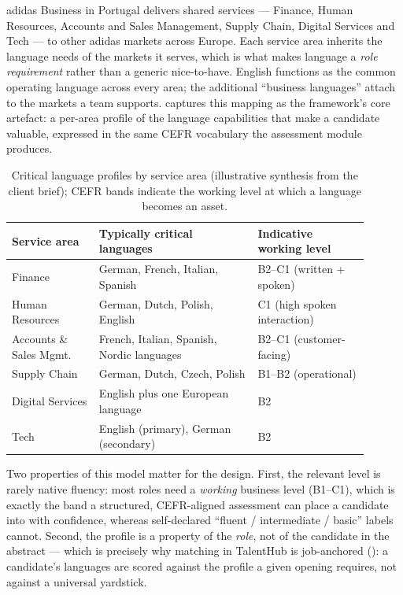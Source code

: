 adidas Business in Portugal delivers shared services --- Finance, Human
Resources, Accounts and Sales Management, Supply Chain, Digital Services and
Tech --- to other adidas markets across Europe. Each service area inherits the
language needs of the markets it serves, which is what makes language a
\emph{role requirement} rather than a generic nice-to-have. English functions
as the common operating language across every area; the additional ``business
languages'' attach to the markets a team supports.
 captures this mapping as the framework's
core artefact: a per-area profile of the language capabilities that make a
candidate valuable, expressed in the same CEFR vocabulary the assessment
module produces.

\begin{table}[ht]
\centering
\caption[Critical language profiles by service area]{Critical language
profiles by service area (illustrative synthesis from the client brief); CEFR
bands indicate the working level at which a language becomes an asset.}
\label{tab:language-profiles}
\small
\begin{tabular}{p{0.22\linewidth}p{0.40\linewidth}p{0.28\linewidth}}
\toprule
\textbf{Service area} & \textbf{Typically critical languages} & \textbf{Indicative working level} \\
\midrule
Finance & German, French, Italian, Spanish & B2--C1 (written + spoken) \\
Human Resources & German, Dutch, Polish, English & C1 (high spoken interaction) \\
Accounts \& Sales Mgmt. & French, Italian, Spanish, Nordic languages & B2--C1 (customer-facing) \\
Supply Chain & German, Dutch, Czech, Polish & B1--B2 (operational) \\
Digital Services & English plus one European language & B2 \\
Tech & English (primary), German (secondary) & B2 \\
\bottomrule
\end{tabular}
\end{table}

Two properties of this model matter for the design. First, the relevant level
is rarely native fluency: most roles need a \emph{working} business level
(B1--C1), which is exactly the band a structured, CEFR-aligned assessment can
place a candidate into with confidence, whereas self-declared ``fluent /
intermediate / basic'' labels cannot. Second, the profile is a property of
the \emph{role}, not of the candidate in the abstract --- which is precisely
why matching in TalentHub is job-anchored (): a
candidate's languages are scored against the profile a given opening
requires, not against a universal yardstick.

